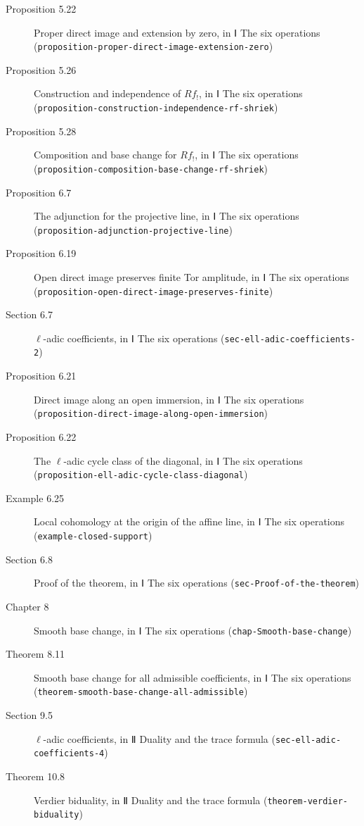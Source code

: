 \documentclass[11pt]{article}
\newcommand{\bpslug}[1]{\texttt{#1}}
\begin{document}
\begin{description}
\item[Proposition 5.22] Proper direct image and extension by zero, in Ⅰ The six operations (\bpslug{proposition-{}\allowbreak{}proper-{}\allowbreak{}direct-{}\allowbreak{}image-{}\allowbreak{}extension-{}\allowbreak{}zero})
\item[Proposition 5.26] Construction and independence of $Rf_!$, in Ⅰ The six operations (\bpslug{proposition-{}\allowbreak{}construction-{}\allowbreak{}independence-{}\allowbreak{}rf-{}\allowbreak{}shriek})
\item[Proposition 5.28] Composition and base change for $Rf_!$, in Ⅰ The six operations (\bpslug{proposition-{}\allowbreak{}composition-{}\allowbreak{}base-{}\allowbreak{}change-{}\allowbreak{}rf-{}\allowbreak{}shriek})
\item[Proposition 6.7] The adjunction for the projective line, in Ⅰ The six operations (\bpslug{proposition-{}\allowbreak{}adjunction-{}\allowbreak{}projective-{}\allowbreak{}line})
\item[Proposition 6.19] Open direct image preserves finite Tor amplitude, in Ⅰ The six operations (\bpslug{proposition-{}\allowbreak{}open-{}\allowbreak{}direct-{}\allowbreak{}image-{}\allowbreak{}preserves-{}\allowbreak{}finite})
\item[Section 6.7] $\ell$-adic coefficients, in Ⅰ The six operations (\bpslug{sec-{}\allowbreak{}ell-{}\allowbreak{}adic-{}\allowbreak{}coefficients-{}\allowbreak{}2})
\item[Proposition 6.21] Direct image along an open immersion, in Ⅰ The six operations (\bpslug{proposition-{}\allowbreak{}direct-{}\allowbreak{}image-{}\allowbreak{}along-{}\allowbreak{}open-{}\allowbreak{}immersion})
\item[Proposition 6.22] The $\ell$-adic cycle class of the diagonal, in Ⅰ The six operations (\bpslug{proposition-{}\allowbreak{}ell-{}\allowbreak{}adic-{}\allowbreak{}cycle-{}\allowbreak{}class-{}\allowbreak{}diagonal})
\item[Example 6.25] Local cohomology at the origin of the affine line, in Ⅰ The six operations (\bpslug{example-{}\allowbreak{}closed-{}\allowbreak{}support})
\item[Section 6.8] Proof of the theorem, in Ⅰ The six operations (\bpslug{sec-{}\allowbreak{}Proof-{}\allowbreak{}of-{}\allowbreak{}the-{}\allowbreak{}theorem})
\item[Chapter 8] Smooth base change, in Ⅰ The six operations (\bpslug{chap-{}\allowbreak{}Smooth-{}\allowbreak{}base-{}\allowbreak{}change})
\item[Theorem 8.11] Smooth base change for all admissible coefficients, in Ⅰ The six operations (\bpslug{theorem-{}\allowbreak{}smooth-{}\allowbreak{}base-{}\allowbreak{}change-{}\allowbreak{}all-{}\allowbreak{}admissible})
\item[Section 9.5] $\ell$-adic coefficients, in Ⅱ Duality and the trace formula (\bpslug{sec-{}\allowbreak{}ell-{}\allowbreak{}adic-{}\allowbreak{}coefficients-{}\allowbreak{}4})
\item[Theorem 10.8] Verdier biduality, in Ⅱ Duality and the trace formula (\bpslug{theorem-{}\allowbreak{}verdier-{}\allowbreak{}biduality})
\end{description}
\clearpage{}%
\end{document}
